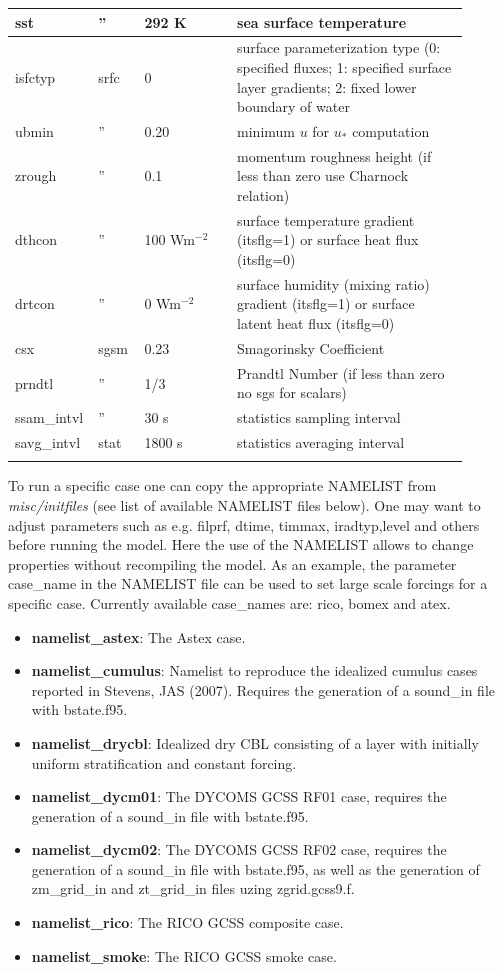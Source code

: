 \documentclass[11pt,a4paper]{article}
\begin{document}
\begin{longtable}[htb]{p{0.1\linewidth}p{0.1\linewidth}p{0.2\linewidth}p{0.5\linewidth}}
sst       & '' & 292 K &  sea surface temperature \\ 
\hline
isfctyp   & srfc & 0  &  surface parameterization type (0: specified
fluxes; 1: specified surface layer gradients; 2: fixed lower boundary
of water\\
 ubmin     & '' & 0.20  &  minimum $u$ for $u_*$ computation \\
 zrough    & '' & 0.1 &  momentum roughness height (if less than
 zero use Charnock relation)\\
 dthcon    & '' &100 Wm$^{-2}$ &  surface temperature gradient
 (itsflg=1) or surface heat flux (itsflg=0) \\
 drtcon    & '' &0   Wm$^{-2}$ &   surface humidity (mixing ratio) gradient
 (itsflg=1) or surface latent heat flux (itsflg=0) \\
\hline
 csx       & sgsm &  0.23   &  Smagorinsky Coefficient \\
 prndtl    &  '' &  1/3    &  Prandtl Number (if less than zero no sgs for
 scalars) \\
\hline
ssam\_intvl&  '' &  30 s  &  statistics sampling interval\\
savg\_intvl& stat & 1800 s    &  statistics averaging interval \\
\hline
\hline
\label{tbl:namelist}
\end{longtable}
To run a specific case one can copy the appropriate NAMELIST from
\emph{misc/initfiles} (see list of available NAMELIST files below).
One may want to adjust parameters such as e.g. filprf, dtime,
timmax, iradtyp,level and others before running the model.
Here the use of the NAMELIST allows to change properties
without recompiling the model. As an example, the parameter
case\_name in the NAMELIST file can be used to set large scale
forcings for a specific case. Currently available case\_names
are: rico, bomex and atex.

\begin{itemize}
\item \textbf{namelist\_astex}: The Astex case.
\item \textbf{namelist\_cumulus}: Namelist to reproduce the idealized
cumulus cases reported in Stevens, JAS (2007). Requires the
generation of a sound\_in file with bstate.f95.
\item \textbf{namelist\_drycbl}: Idealized dry CBL consisting of a
layer with initially uniform stratification and constant forcing.
\item \textbf{namelist\_dycm01}: The DYCOMS GCSS RF01 case, requires
the generation of a sound\_in file with bstate.f95.
\item \textbf{namelist\_dycm02}: The DYCOMS GCSS RF02 case, requires
the generation of a sound\_in file with bstate.f95, as well as the
generation of zm\_grid\_in and zt\_grid\_in files uzing zgrid.gcss9.f.
\item \textbf{namelist\_rico}: The RICO GCSS composite case.
\item \textbf{namelist\_smoke}: The RICO GCSS smoke case.
\end{itemize}
\end{document}
